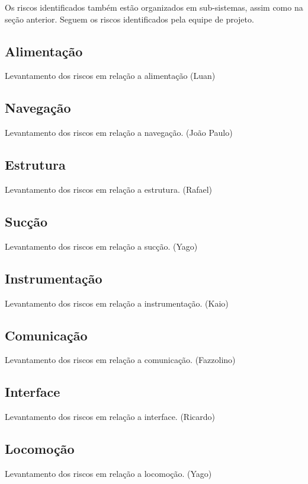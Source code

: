 Os riscos identificados também estão organizados em sub-sistemas, assim como na seção anterior. Seguem os riscos identificados pela equipe de projeto.

\subsection{Alimentação} %
\label{sub:alimentação}
	Levantamento dos riscos em relação a alimentação (Luan)

\subsection{Navegação} %
\label{sub:automação}
	Levantamento dos riscos em relação a navegação. (João Paulo)

\subsection{Estrutura} %
\label{sub:alimentação}
	Levantamento dos riscos em relação a estrutura. (Rafael)

\subsection{Sucção} %
\label{sub:aspirador}
	Levantamento dos riscos em relação a sucção. (Yago)

\subsection{Instrumentação} %
\label{sub:instrumentação}
	Levantamento dos riscos em relação a instrumentação. (Kaio)

\subsection{Comunicação} %
\label{sub:comunicação}
	Levantamento dos riscos em relação a comunicação. (Fazzolino)

\subsection{Interface} %
\label{sub:interface}
	Levantamento dos riscos em relação a interface. (Ricardo)

\subsection{Locomoção} %
\label{sub:locomoção}
	Levantamento dos riscos em relação a locomoção. (Yago)
